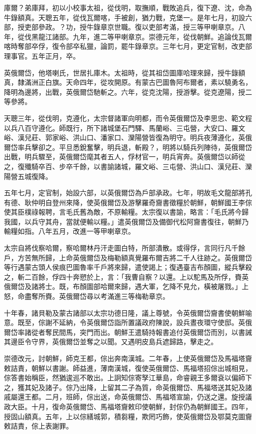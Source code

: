 \begin{pinyinscope}
庫爾？弟庫拜，初以小校事太祖，從伐明，取撫順，戰敗追兵，復下遼、沈，命為牛錄額真。天聰五年，從伐瓦爾喀，手被創，猶力戰，克堡一。是年七月，初設六部，授吏部參政。？功，授牛錄章京世職。復以吏部考滿，授三等甲喇章京。八年，從伐黑龍江諸部。九年，進二等甲喇章京。崇德元年，從伐朝鮮。追論伐瓦爾喀時奪部卒俘，復令部卒私獵，論罰，罷牛錄章京。三年七月，更定官制，改吏部理事官。五年正月，卒。

英俄爾岱，他塔喇氏，世居扎庫木。太祖時，從其祖岱圖庫哈理來歸，授牛錄額真，隸滿洲正白旗。天命四年，從攻開原。有蒙古巴圖魯阿布爾者，素以驍勇名，降明為邊將，出戰，英俄爾岱馳斬之。六年，從克沈陽，授游擊。從克遼陽，授二等參將。

天聰三年，從伐明，克遵化，太宗督諸軍向明都，而令英俄爾岱及李思忠、範文程以兵八百守遵化。師既行，所下諸城堡石門驛、馬蘭峪、三屯營，大安口、羅文峪、漢兒莊、郭家峪、洪山口、潘家口、灤陽營皆復為明守。明兵夜薄遵化，英俄爾岱率兵擊卻之。平旦悉銳奮擊，明兵退，斬殿？，明將以騎兵列陣待，英俄爾岱出戰，明兵驟至，英俄爾岱麾其者五人，俘材官一，明兵宵奔。英俄爾岱以師從之，復殲騎卒百、步卒千餘，以書諭諸城，羅文峪、三屯營、洪山口、漢兒莊、灤陽營五城復降。

五年七月，定官制，始設六部，以英俄爾岱為戶部承政。七年，明故毛文龍部將孔有德、耿仲明自登州來降，使英俄爾岱及游擊羅奇齎書徵糧於朝鮮，朝鮮國王李倧使其臣樸祿報聘，言毛氏舊為敵，不原輸糧。太宗復以書諭，略言：「毛氏將今歸我國，以兵守其舟，當就便輸以糧。」遣英俄爾岱及備御代松阿齎書復往，朝鮮乃輸糧如指。八年五月，改進一等甲喇章京。

太宗自將伐察哈爾，察哈爾林丹汗走圖白特，所部潰散。或得俘，言同行凡千餘戶，方苦無所歸，上命英俄爾岱及梅勒額真覺羅布爾吉將二千人往跡之。英俄爾岱等行遇蒙古頭人侯痕巴圖魯率千戶將來歸，遣使謁上；復遇臺吉布顏圖，縱兵擊殺之，斬二百餘，俘四十奔愬於上，言：「我曹自察？以還。上以駝馬及所俘，賚英俄爾岱及諸將士。既，布顏圖部哈爾來歸，遇大軍，乞降不見允，橫被屠戮。」上怒，命盡奪所賚。英俄爾岱尋以考滿進三等梅勒章京。

十年春，諸貝勒及蒙古諸部以太宗功德日隆，議上尊號，令英俄爾岱齎書使朝鮮喻意。既至，倧謝不延納，令英俄爾岱詣所置議政府陳說，設兵晝夜環守使邸。英俄爾岱率諸從者奪民間馬，突門而出。朝鮮王遣騎持報書追付英俄爾岱而別，以書誡其邊臣令守界，英俄爾岱並奪之以聞。又遇明皮島兵遮歸路，擊走之。

崇德改元，討朝鮮，師克王都，倧出奔南漢城。二年春，上使英俄爾岱及馬福塔齎敕詰責，朝鮮以書謝。師益進，薄南漢城，復使英俄爾岱、馬福塔招倧出城相見，倧答書始稱臣，然猶逡巡不敢出。上詗知倧寄孥江華島，命睿親王多爾袞以偏師下之，獲其妃及諸子。倧乃出降，上留其二子為質，命英俄爾岱、馬福塔送其妃及諸戚屬還王都。二月，班師，倧出送，命英俄爾岱、馬福塔宣諭，仍送之還。旋授議政大臣。十月，復命英俄爾岱、馬福塔齎敕印使朝鮮，封倧仍為朝鮮國王。四年，授固山額真。五年，上以倧繕城郭，積芻糧，欺罔巧飾，使英俄爾岱及鄂莫克圖齎敕詰責，倧上表謝罪。


\end{pinyinscope}
